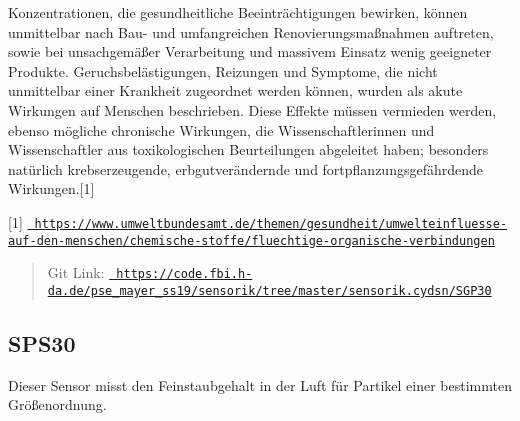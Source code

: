 Konzentrationen, die gesundheitliche Beeinträchtigungen bewirken, können unmittelbar nach Bau-\/ und umfangreichen Renovierungsmaßnahmen auftreten, sowie bei unsachgemäßer Verarbeitung und massivem Einsatz wenig geeigneter Produkte. Geruchsbelästigungen, Reizungen und Symptome, die nicht unmittelbar einer Krankheit zugeordnet werden können, wurden als akute Wirkungen auf Menschen beschrieben. Diese Effekte müssen vermieden werden, ebenso mögliche chronische Wirkungen, die Wissenschaftlerinnen und Wissenschaftler aus toxikologischen Beurteilungen abgeleitet haben; besonders natürlich krebserzeugende, erbgutverändernde und fortpflanzungsgefährdende Wirkungen.\mbox{[}1\mbox{]}

\mbox{[}1\mbox{]} \href{https://www.umweltbundesamt.de/themen/gesundheit/umwelteinfluesse-auf-den-menschen/chemische-stoffe/fluechtige-organische-verbindungen}{\texttt{ https\+://www.\+umweltbundesamt.\+de/themen/gesundheit/umwelteinfluesse-\/auf-\/den-\/menschen/chemische-\/stoffe/fluechtige-\/organische-\/verbindungen}}

\begin{quote}
Git Link\+: \href{https://code.fbi.h-da.de/pse_mayer_ss19/sensorik/tree/master/sensorik.cydsn/SGP30}{\texttt{ https\+://code.\+fbi.\+h-\/da.\+de/pse\+\_\+mayer\+\_\+ss19/sensorik/tree/master/sensorik.\+cydsn/\+S\+G\+P30}} \end{quote}
\hypertarget{index_autotoc_md8}{}\subsection{S\+P\+S30}\label{index_autotoc_md8}
Dieser Sensor misst den Feinstaubgehalt in der Luft für Partikel einer bestimmten Größenordnung.


